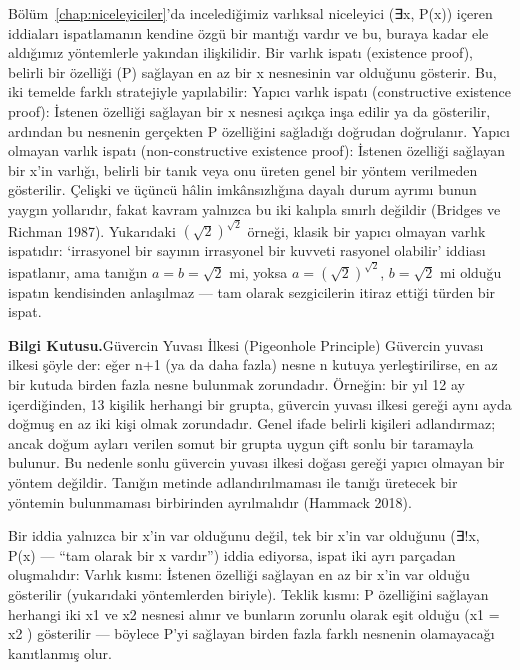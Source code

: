 Bölüm~\ref{chap:niceleyiciler}’da incelediğimiz varlıksal niceleyici (∃x, P(x)) içeren iddiaları ispatlamanın kendine özgü bir mantığı vardır ve bu, buraya kadar ele aldığımız yöntemlerle yakından ilişkilidir. Bir varlık ispatı (existence proof), belirli bir özelliği (P) sağlayan en az bir x nesnesinin var olduğunu gösterir. Bu, iki temelde farklı stratejiyle yapılabilir: Yapıcı varlık ispatı (constructive existence proof): İstenen özelliği sağlayan bir x nesnesi açıkça inşa edilir ya da gösterilir, ardından bu nesnenin gerçekten P özelliğini sağladığı doğrudan doğrulanır. Yapıcı olmayan varlık ispatı (non-constructive existence proof): İstenen özelliği sağlayan bir x’in varlığı, belirli bir tanık veya onu üreten genel bir yöntem verilmeden gösterilir. Çelişki ve üçüncü hâlin imkânsızlığına dayalı durum ayrımı bunun yaygın yollarıdır, fakat kavram yalnızca bu iki kalıpla sınırlı değildir (Bridges ve Richman 1987). Yukarıdaki $(\sqrt2)^{\sqrt2}$ örneği, klasik bir yapıcı olmayan varlık ispatıdır: ‘irrasyonel bir sayının irrasyonel bir kuvveti rasyonel olabilir’ iddiası ispatlanır, ama tanığın $a=b=\sqrt2$ mi, yoksa $a=(\sqrt2)^{\sqrt2}$, $b=\sqrt2$ mi olduğu ispatın kendisinden anlaşılmaz — tam olarak sezgicilerin itiraz ettiği türden bir ispat.

\begin{tcolorbox}[bookbox,colback=cEx]\textbf{\textsf{\textcolor{cAcc}{Bilgi Kutusu.}}}\quad Güvercin Yuvası İlkesi (Pigeonhole Principle) Güvercin yuvası ilkesi şöyle der: eğer n+1 (ya da daha fazla) nesne n kutuya yerleştirilirse, en az bir kutuda birden fazla nesne bulunmak zorundadır. Örneğin: bir yıl 12 ay içerdiğinden, 13 kişilik herhangi bir grupta, güvercin yuvası ilkesi gereği aynı ayda doğmuş en az iki kişi olmak zorundadır. Genel ifade belirli kişileri adlandırmaz; ancak doğum ayları verilen somut bir grupta uygun çift sonlu bir taramayla bulunur. Bu nedenle sonlu güvercin yuvası ilkesi doğası gereği yapıcı olmayan bir yöntem değildir. Tanığın metinde adlandırılmaması ile tanığı üretecek bir yöntemin bulunmaması birbirinden ayrılmalıdır (Hammack 2018).\end{tcolorbox}

Bir iddia yalnızca bir x’in var olduğunu değil, tek bir x’in var olduğunu (∃!x, P(x) — “tam olarak bir x vardır”) iddia ediyorsa, ispat iki ayrı parçadan oluşmalıdır: Varlık kısmı: İstenen özelliği sağlayan en az bir x’in var olduğu gösterilir (yukarıdaki yöntemlerden biriyle). Teklik kısmı: P özelliğini sağlayan herhangi iki x1 ve x2 nesnesi alınır ve bunların zorunlu olarak eşit olduğu (x1 = x2 ) gösterilir — böylece P’yi sağlayan birden fazla farklı nesnenin olamayacağı kanıtlanmış olur.

